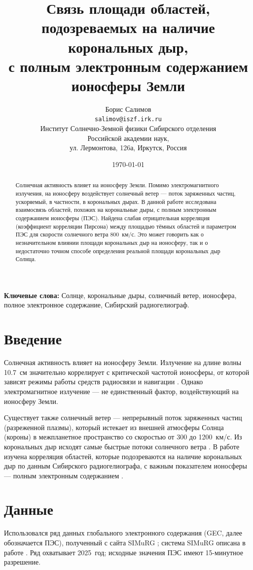 \documentclass[11pt,a4paper]{article}
\title{Связь площади областей, подозреваемых на наличие корональных дыр,\\
с полным электронным содержанием ионосферы Земли}
\author{Борис Салимов\\
\texttt{salimov@iszf.irk.ru}\\
Институт Солнечно-Земной физики Сибирского отделения\\
Российской академии наук,\\
ул. Лермонтова, 126а, Иркутск, Россия}
\date{\today}
\begin{document}
\maketitle

\begin{abstract}
Солнечная активность влияет на ионосферу Земли. Помимо электромагнитного
излучения, на ионосферу воздействует солнечный ветер --- поток заряженных
частиц, ускоряемый, в частности, в корональных дырах. В данной работе
исследована взаимосвязь
областей, похожих на корональные дыры, с полным электронным содержанием
ионосферы (ПЭС). Найдена слабая отрицательная корреляция (коэффициент
корреляции Пирсона) между площадью тёмных областей и параметром ПЭС для
скорости солнечного ветра 800~км/с. Это может говорить как о незначительном
влиянии площади корональных дыр на ионосферу, так и о недостаточно точном
способе определения реальной площади корональных дыр Солнца.
\end{abstract}

\noindent\textbf{Ключевые слова:} Солнце, корональные дыры, солнечный ветер,
ионосфера, полное электронное содержание, Сибирский радиогелиограф.

\section{Введение}

Солнечная активность влияет на ионосферу Земли. Излучение на длине волны
10.7~см значительно коррелирует с критической частотой ионосферы, от которой
зависят режимы работы средств радиосвязи и навигации \citep{tapping2013f107}.
Однако электромагнитное излучение --- не единственный фактор, воздействующий
на ионосферу Земли.

Существует также солнечный ветер --- непрерывный поток заряженных частиц
(разреженной плазмы), который истекает из внешней атмосферы Солнца (короны)
в межпланетное пространство со скоростью от 300 до 1200~км/с. Из корональных
дыр исходят самые быстрые потоки солнечного ветра \citep{cranmer2019properties}.
В работе изучена корреляция областей, которые подозреваются на наличие
корональных дыр по данным Сибирского радиогелиографа, с важным показателем
ионосферы --- полным электронным содержанием \citep{afraimovich2008gec}.

\section{Данные}

Использовался ряд данных глобального электронного содержания (GEC, далее
обозначается ПЭС), полученный с сайта SIMuRG \citep{simurg2025}; система
SIMuRG описана в работе
\citet{yasyukevich2020simurg}. Ряд охватывает 2025~год; исходные значения
ПЭС имеют 15-минутное разрешение.
\end{document}
